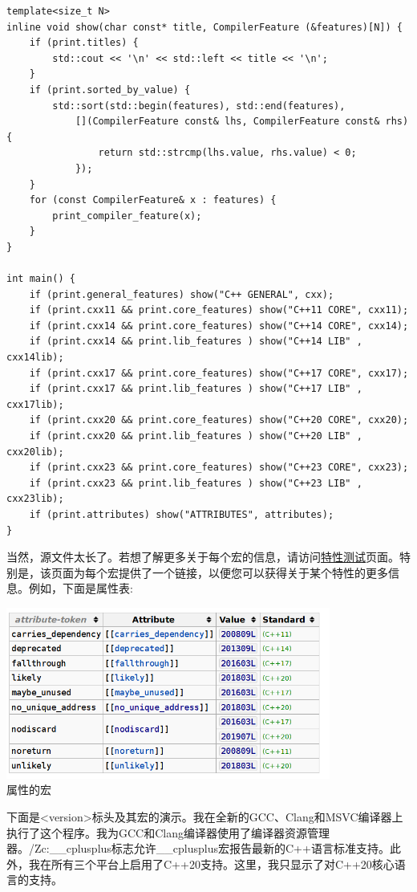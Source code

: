 \begin{lstlisting}[style=styleCXX]
template<size_t N>
inline void show(char const* title, CompilerFeature (&features)[N]) {
	if (print.titles) {
		std::cout << '\n' << std::left << title << '\n';
	}
	if (print.sorted_by_value) {
		std::sort(std::begin(features), std::end(features),
			[](CompilerFeature const& lhs, CompilerFeature const& rhs) {
				return std::strcmp(lhs.value, rhs.value) < 0;
			});
	}
	for (const CompilerFeature& x : features) {
		print_compiler_feature(x);
	}
}

int main() {
	if (print.general_features) show("C++ GENERAL", cxx);
	if (print.cxx11 && print.core_features) show("C++11 CORE", cxx11);
	if (print.cxx14 && print.core_features) show("C++14 CORE", cxx14);
	if (print.cxx14 && print.lib_features ) show("C++14 LIB" , cxx14lib);
	if (print.cxx17 && print.core_features) show("C++17 CORE", cxx17);
	if (print.cxx17 && print.lib_features ) show("C++17 LIB" , cxx17lib);
	if (print.cxx20 && print.core_features) show("C++20 CORE", cxx20);
	if (print.cxx20 && print.lib_features ) show("C++20 LIB" , cxx20lib);
	if (print.cxx23 && print.core_features) show("C++23 CORE", cxx23);
	if (print.cxx23 && print.lib_features ) show("C++23 LIB" , cxx23lib);
	if (print.attributes) show("ATTRIBUTES", attributes);
}
\end{lstlisting}

当然，源文件太长了。若想了解更多关于每个宏的信息，请访问\href{https://en.cppreference.com/w/cpp/feature_test}{特性测试}页面。特别是，该页面为每个宏提供了一个链接，以便您可以获得关于某个特性的更多信息。例如，下面是属性表:

\begin{center}
\includegraphics[width=0.8\textwidth]{content/5/chapter9/images/2.png}\\
属性的宏
\end{center}

下面是<version>标头及其宏的演示。我在全新的GCC、Clang和MSVC编译器上执行了这个程序。我为GCC和Clang编译器使用了编译器资源管理器。/Zc:\_\_cplusplus标志允许\_\_cplusplus宏报告最新的C++语言标准支持。此外，我在所有三个平台上启用了C++20支持。这里，我只显示了对C++20核心语言的支持。

